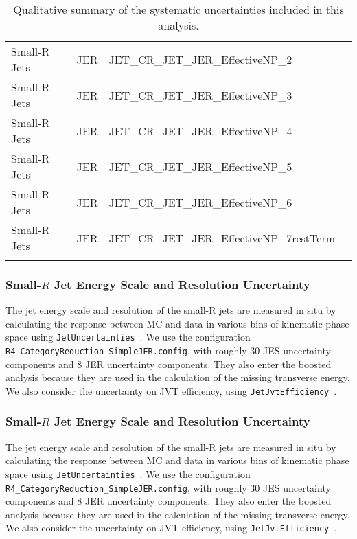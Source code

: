 \begin{table}[!hp]
\begin{center}
\begin{tabular}{|l|l|l|l|}
      Small-R Jets  & JER                  &  JET\_CR\_JET\_JER\_EffectiveNP\_2           \\
      Small-R Jets  & JER                  &  JET\_CR\_JET\_JER\_EffectiveNP\_3           \\
      Small-R Jets  & JER                  &  JET\_CR\_JET\_JER\_EffectiveNP\_4           \\
      Small-R Jets  & JER                  &  JET\_CR\_JET\_JER\_EffectiveNP\_5           \\
      Small-R Jets  & JER                  &  JET\_CR\_JET\_JER\_EffectiveNP\_6           \\
      Small-R Jets  & JER                  &  JET\_CR\_JET\_JER\_EffectiveNP\_7restTerm   \\
      \hline
  \caption{ Qualitative summary of the systematic uncertainties included in this analysis. }
  \label{tab:syst_summary_sources_2}
  \end{tabular}

  \subsubsection*{Small-$R$ Jet Energy Scale and Resolution Uncertainty}
  The jet energy scale and resolution of the small-R jets are measured in situ by calculating
the response between MC and data in various bins of kinematic phase space using \texttt{JetUncertainties}~\cite{JetUncertainties}.
We use the configuration \texttt{R4\_CategoryReduction\_SimpleJER.config},
with roughly 30 JES uncertainty components and 8 JER uncertainty components.
They also enter the boosted analysis because they are used in the calculation of the missing transverse energy.
We also consider the uncertainty on JVT efficiency, using \texttt{JetJvtEfficiency}~\cite{JVTCalib}.

\subsubsection*{Small-$R$ Jet Energy Scale and Resolution Uncertainty}
The jet energy scale and resolution of the small-R jets are measured in situ by calculating
the response between MC and data in various bins of kinematic phase space using \texttt{JetUncertainties}~\cite{JetUncertainties}.
We use the configuration \texttt{R4\_CategoryReduction\_SimpleJER.config},
with roughly 30 JES uncertainty components and 8 JER uncertainty components.
They also enter the boosted analysis because they are used in the calculation of the missing transverse energy.
We also consider the uncertainty on JVT efficiency, using \texttt{JetJvtEfficiency}~\cite{JVTCalib}.



\end{center}
\end{table}
